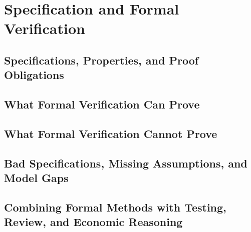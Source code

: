 \chapter{Specification and Formal Verification}

\section{Specifications, Properties, and Proof Obligations}

\section{What Formal Verification Can Prove}

\section{What Formal Verification Cannot Prove}

\section{Bad Specifications, Missing Assumptions, and Model Gaps}

\section{Combining Formal Methods with Testing, Review, and Economic Reasoning}
